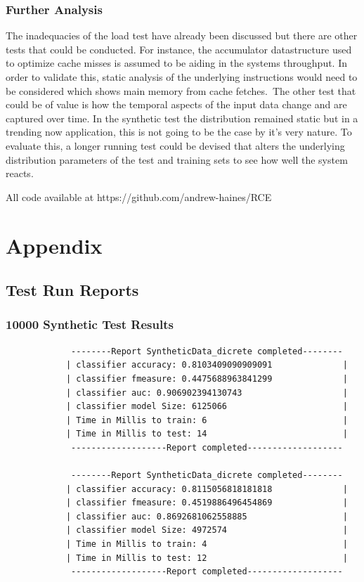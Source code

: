 \documentclass[a4paper,11pt]{scrreprt}
\begin{document}
\subsection{Further Analysis}
The inadequacies of the load test have already been discussed but there are other tests that could be conducted. For instance, the accumulator datastructure used to optimize cache misses is assumed to be aiding in the systems throughput. In order to validate this, static analysis of the underlying instructions would need to be considered which shows main memory from cache fetches.\
The other test that could be of value is how the temporal aspects of the input data change and are captured over time. In the synthetic test the distribution remained static but in a trending now application, this is not going to be the case by it's very nature. To evaluate this, a longer running test could be devised that alters the underlying distribution parameters of the test and training sets to see how well the system reacts.

\par{}%
\null\vfill

\parbox{\textwidth}{All code available at https://github.com/andrew-haines/RCE}

\printbibliography

\chapter{Appendix}
\section{Test Run Reports}
\subsection{10000 Synthetic Test Results}
\begin{verbatim}
			 --------Report SyntheticData_dicrete completed--------
			| classifier accuracy: 0.8103409090909091              |
			| classifier fmeasure: 0.4475688963841299              |
			| classifier auc: 0.906902394130743                    |
			| classifier model Size: 6125066                       |
			| Time in Millis to train: 6                           |
			| Time in Millis to test: 14                           |
			 -------------------Report completed-------------------
			
			 --------Report SyntheticData_dicrete completed--------
			| classifier accuracy: 0.8115056818181818              |
			| classifier fmeasure: 0.4519886496454869              |
			| classifier auc: 0.8692681062558885                   |
			| classifier model Size: 4972574                       |
			| Time in Millis to train: 4                           |
			| Time in Millis to test: 12                           |
			 -------------------Report completed-------------------
\end{verbatim}			
\end{document}
